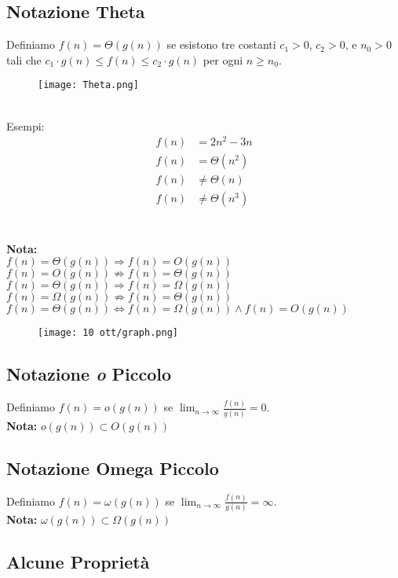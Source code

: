 \documentclass{article}
\begin{document}
\subsection{Notazione Theta}
Definiamo $f(n) = \Theta(g(n))$ se esistono tre costanti $c_1 > 0$, $c_2 > 0$, e $n_0 > 0$ tali che $c_1 \cdot g(n) \leq f(n) \leq c_2 \cdot g(n)$ per ogni $n \geq n_0$.
\begin{figure}[h]
  \centering
  \texttt{[image: Theta.png]}
\end{figure}
\\
Esempi:
\begin{align}
    f(n) &= 2n^2 - 3n \\
    f(n) &= \Theta(n^2) \\
    f(n) &\neq \Theta(n) \\
    f(n) &\neq \Theta(n^3)
\end{align}
\\\\
\textbf{Nota:} \\
$f(n) = \Theta(g(n)) \Rightarrow f(n) = O(g(n))$ \\
$f(n) = O(g(n)) \not\Rightarrow f(n) = \Theta(g(n))$ \\
$f(n) = \Theta(g(n)) \Rightarrow f(n) = \Omega(g(n))$ \\
$f(n) = \Omega(g(n)) \not\Rightarrow f(n) = \Theta(g(n))$ \\
$f(n) = \Theta(g(n)) \Leftrightarrow f(n) = \Omega(g(n)) \land  f(n) = O(g(n))$

\begin{figure}[h]
  \centering
  \texttt{[image: 10 ott/graph.png]}
\end{figure}

\subsection{Notazione \textit{o} Piccolo}
Definiamo $f(n) = o(g(n))$ se $\lim_{n \to \infty} \frac{f(n)}{g(n)} = 0$.
\\
\textbf{Nota:}
$o(g(n)) \subset O(g(n))$
\subsection{Notazione Omega Piccolo}
Definiamo $f(n) = \omega(g(n))$ se $\lim_{n \to \infty} \frac{f(n)}{g(n)} = \infty$.
\\
\textbf{Nota:}
$\omega(g(n)) \subset \Omega(g(n))$
\subsection{Alcune Proprietà}
\end{document}
